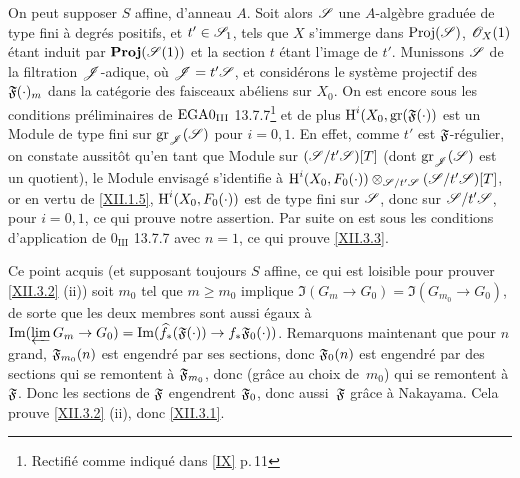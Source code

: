 On peut supposer $S$ affine, d'anneau $A$. Soit alors ${\mathscr S}$ une $A$-alg\`ebre gradu\'ee de type fini \`a degr\'es positifs, et $t'\in{\mathscr S}_1$, tels que $X$ s'immerge dans $\operatorname{Proj}({\mathscr S})$, $\mathscr{O}_X(1)$ \'etant induit par $\operatorname{\mathbf{Proj}}({\mathscr S}(1))$ et la section $t$ \'etant l'image de $t'$. Munissons ${\mathscr S}$ de la filtration ${\mathscr J}$-adique, o\`u ${\mathscr J}=t'{\mathscr S}$, et consid\'erons le syst\`eme projectif des $\mathfrak{F}(\cdot)_m$ dans la cat\'egorie des faisceaux ab\'eliens sur $X_0$. On est encore sous les conditions pr\'eliminaires de $\textup{EGA}\space 0_{\textup{III}}$ 13.7.7\footnote{Rectifi\'e comme indiqu\'e dans \ref{IX} p.\,11} et de plus $\operatorname{H}^i(X_0, \operatorname{gr}(\mathfrak{F}(\cdot))$ est un Module de type fini sur $\operatorname{gr}_{\mathscr J}({\mathscr S})$ pour $i=0, 1$. En effet, comme $t'$ est $\mathfrak{F}$-r\'egulier, on constate aussit\^{o}t qu'en tant que Module sur $({\mathscr S} /t'{\mathscr S})[T]$ (dont $\operatorname{gr}_{\mathscr J}({\mathscr S})$ est un quotient), le Module envisag\'e s'identifie \`a $\operatorname{H}^i(X_0, F_0(\cdot))\otimes_{{\mathscr S} /t'{\mathscr S}}({\mathscr S} /t'{\mathscr S})[T]$, or en vertu de \ref{XII.1.5}, $\operatorname{H}^i(X_0, F_0(\cdot))$ est de type fini sur ${\mathscr S}$, donc sur ${\mathscr S} /t'{\mathscr S}$, pour $i=0, 1$, ce qui prouve notre assertion. Par suite on est sous les conditions d'application de $0_{\text{III}}$ 13.7.7 avec $n=1$, ce qui prouve \ref{XII.3.3}.

Ce point acquis (et supposant toujours $S$ affine, ce qui est loisible pour prouver \ref{XII.3.2} (ii)) soit $m_0$ tel que $m\geq m_0$ implique $\Im(G_m\to G_0)= \Im(G_{m_0}\to G_0)$, de sorte que les deux membres sont aussi \'egaux \`a $\Im(\varprojlim G_m\to G_0) = \Im(\widehat{f}_\ast(\formelF(\cdot))\to f_\ast\formelF_0(\cdot))$. Remarquons maintenant que pour $n$ grand, $\mathfrak{F}_{m_0}(n)$ est engendr\'e par ses sections, donc $\mathfrak{F}_0(n)$ est engendr\'e par des sections qui se remontent \`a $\mathfrak{F}_{m_0}$, donc (gr\^ace au choix de~$m_0$) qui se remontent \`a $\mathfrak{F}$. Donc les sections de $\mathfrak{F}$ engendrent $\mathfrak{F}_0$, donc aussi~$\mathfrak{F}$ gr\^ace \`a Nakayama. Cela prouve \ref{XII.3.2} (ii), donc \ref{XII.3.1}.

